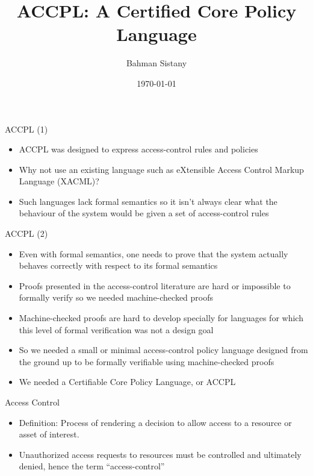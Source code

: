 \documentclass{beamer}
\title{ACCPL: A Certified Core Policy Language}
\author{Bahman Sistany}
\date{\today}
\begin{document}
\begin{frame}
\titlepage
\end{frame}

\begin{frame}{ACCPL (1)}
\LARGE
\begin{itemize}
   \item ACCPL was designed to express access-control rules and policies
   \item Why not use an existing language such as eXtensible Access Control Markup Language (XACML)? 
   \item Such languages lack formal semantics so it isn't always clear what the behaviour of the system would be given a set of access-control rules
\end{itemize}
\end{frame}

\begin{frame}{ACCPL (2)}
\begin{itemize}
   \item Even with formal semantics, one needs to prove that the system actually behaves correctly with respect to its formal semantics
   \item Proofs presented in the access-control literature are hard or impossible to formally verify so we needed machine-checked proofs
   \item Machine-checked proofs are hard to develop specially for languages for which this level of formal verification was not a design goal
   \item So we needed a small or minimal access-control policy language designed from the ground up to be formally verifiable using machine-checked proofs
   \item We needed a Certifiable Core Policy Language, or ACCPL
\end{itemize}
\end{frame}

\begin{frame}{Access Control}
\begin{itemize}
   \item Definition: Process of rendering a decision to allow access to a resource or asset of interest.
   \item Unauthorized access requests to resources must be controlled and ultimately denied, hence the term ``access-control''
\end{itemize}
\end{frame}
\end{document}
